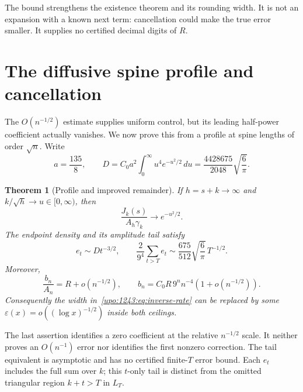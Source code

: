 \documentclass[11pt,letterpaper]{article}
\newtheorem{theorem}{Theorem}[section]
\theoremstyle{remark}\newtheorem{remark}[theorem]{Remark}
\numberwithin{equation}{section}
\begin{document}
The bound strengthens the existence theorem and its rounding width.
It is not an expansion with a known next term: cancellation could make
the true error smaller. It supplies no certified decimal digits of $R$.

\section{The diffusive spine profile and cancellation}\label{upo:1243:sec:profile}
The $O(n^{-1/2})$ estimate supplies uniform control, but its leading
half-power coefficient actually vanishes. We now prove this from a
profile at spine lengths of order $\sqrt n$. Write
\begin{equation}\label{upo:1243:eq:Dconstant}
 a=\frac{135}{8},\qquad
 D=C_0a^2\int_0^\infty u^4e^{-u^2/2}\,du
   =\frac{4428675}{2048}\sqrt{\frac6\pi}.
\end{equation}

\begin{theorem}[Profile and improved remainder]\label{upo:1243:thm:profile}
If $h=s+k\to\infty$ and $k/\sqrt h\to u\in[0,\infty)$, then
\begin{equation}\label{upo:1243:eq:Jprofile}
 \frac{J_k(s)}{A_h\gamma_k}\longrightarrow e^{-u^2/2}.
\end{equation}
The endpoint density and its amplitude tail satisfy
\begin{equation}\label{upo:1243:eq:etail-equivalent}
 e_t\sim Dt^{-3/2},\qquad
 \frac2{9^4}\sum_{t>T}e_t
 \sim\frac{675}{512}\sqrt{\frac6\pi}\,T^{-1/2}.
\end{equation}
Moreover,
\begin{equation}\label{upo:1243:eq:little-rate}
 \frac{b_n}{A_n}=R+o(n^{-1/2}),\qquad
 b_n=C_0R\,9^n n^{-4}(1+o(n^{-1/2})).
\end{equation}
Consequently the width in~\eqref{upo:1243:eq:inverse-rate} can be replaced by some
$\varepsilon(x)=o((\log x)^{-1/2})$ inside both ceilings.
\end{theorem}

The last assertion identifies a zero coefficient at the relative
$n^{-1/2}$ scale. It neither proves an $O(n^{-1})$ error nor identifies
the first nonzero correction. The tail equivalent is asymptotic and has
no certified finite-$T$ error bound. Each $e_t$ includes the full sum
over $k$; this $t$-only tail is distinct from the omitted triangular
region $k+t>T$ in $L_T$.
\end{document}
